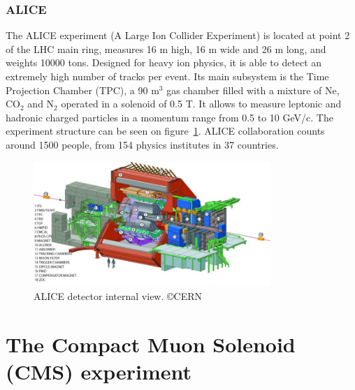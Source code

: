 
\subsubsection{ALICE}
\label{sec:alice}

The ALICE experiment (A Large Ion Collider Experiment) is located at point 2 of the LHC main ring, measures 16 m high, 16 m wide and 26 m long, and weights 10000 tons. Designed for heavy ion physics, it is able to detect an extremely high number of tracks per event. Its main subsystem is the Time Projection Chamber (TPC), a 90 $\text{m}^{3}$ gas chamber filled with a mixture of Ne, $\text{CO}_{2}$ and $\text{N}_{2}$ operated in a solenoid of 0.5 T. It allows to measure leptonic and hadronic charged particles in a momentum range from 0.5 to 10 GeV/c. The experiment structure can be seen on figure~\ref{fig:alicedet}. ALICE collaboration counts around 1500 people, from 154 physics institutes in 37 countries.

\begin{figure}[!Hhtbp]
  \begin{center}
    \includegraphics[width=0.8\textwidth]{figs/alice2.jpg}
    \caption{ALICE detector internal view. \copyright CERN}
    \label{fig:alicedet}
  \end{center}
\end{figure}

\section{The Compact Muon Solenoid (CMS) experiment}
\label{sec:CMS}

